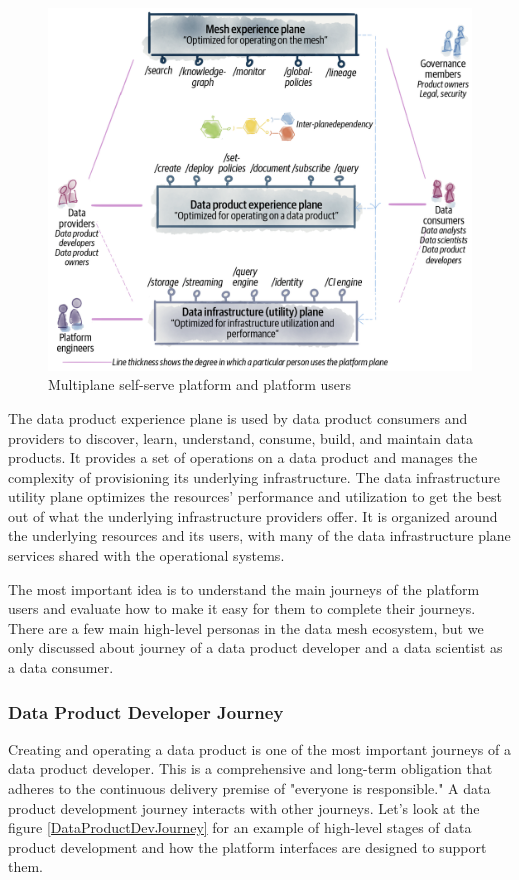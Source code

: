 \documentclass[12pt, a4paper]{book}
\begin{document}
\begin{figure}[h]
	\begin{framed}
		\centering
		\includegraphics[width=12cm]{multiplane.png}
		\caption{Multiplane self-serve platform and platform users}
		\label{multiplane}
	\end{framed}
\end{figure}

The data product experience plane is used by data product consumers and providers to discover, learn, understand, consume, build, and maintain data products. It provides a set of operations on a data product and manages the complexity of provisioning its underlying infrastructure. The data infrastructure utility plane optimizes the resources’ performance and utilization to get the best out of what the underlying infrastructure providers offer. It is organized around the underlying resources and its users, with many of the data infrastructure plane services shared with the operational systems.

The most important idea is to understand the main journeys of the platform users and evaluate how to make it easy for them to complete their journeys. There are a few main high-level personas in the data mesh ecosystem, but we only discussed about journey of a data product developer and a data scientist as a data consumer.

\subsubsection*{Data Product Developer Journey}
Creating and operating a data product is one of the most important journeys of a data product developer. This is a comprehensive and long-term obligation that adheres to the continuous delivery premise of "everyone is responsible." A data product development journey interacts with other journeys. Let’s look at the figure \ref{DataProductDevJourney} for an example of high-level stages of data product development and how the platform interfaces are designed to support them.
\end{document}
